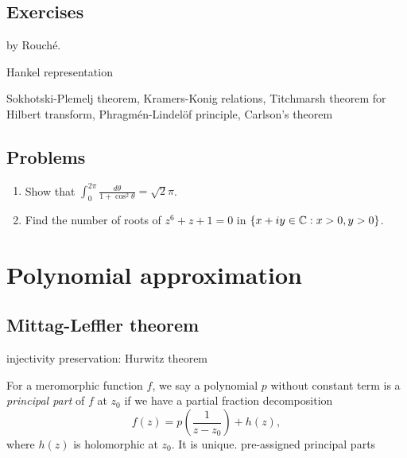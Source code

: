 \documentclass{../../large}
\begin{document}
\section*{Exercises}
\begin{prb}
by Rouch\'e.
\end{prb}
\begin{prb}
\end{prb}
\begin{prb}
Hankel representation
\end{prb}
\begin{prb}
\end{prb}

Sokhotski-Plemelj theorem,
Kramers-Konig relations,
Titchmarsh theorem for Hilbert transform,
Phragm\'en-Lindel\"of principle,
Carlson's theorem

\section*{Problems}
\begin{enumerate}
\item Show that $\int_0^{2\pi}\frac{d\theta}{1+\cos^2\theta}=\sqrt2\pi$.
\item Find the number of roots of $z^6+z+1=0$ in $\{x+iy\in\mathbb{C}:x>0,y>0\}$.
\end{enumerate}




\chapter{Polynomial approximation}
\section{Mittag-Leffler theorem}
\begin{prb}
\begin{parts}
\item injectivity preservation: Hurwitz theorem
\end{parts}
\end{prb}

\begin{prb}
For a meromorphic function $f$, we say a polynomial $p$ without constant term is a \emph{principal part} of $f$ at $z_0$ if we have a partial fraction decomposition
\[f(z)=p\left(\frac1{z-z_0}\right)+h(z),\]
where $h(z)$ is holomorphic at $z_0$.
It is unique.
pre-assigned principal parts
\end{prb}
\end{document}
